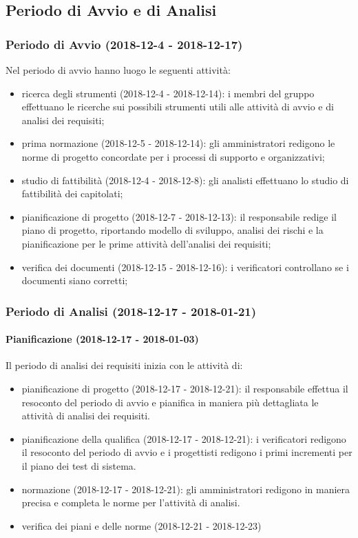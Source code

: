 \subsection{Periodo di Avvio e di Analisi }
	\subsubsection{Periodo di Avvio (2018-12-4 - 2018-12-17)}
		Nel periodo di avvio hanno luogo le seguenti attività:
		\begin{itemize}
			\item ricerca degli strumenti (2018-12-4 - 2018-12-14): i membri del gruppo effettuano le ricerche sui possibili strumenti utili alle attività di avvio e di analisi dei requisiti;
			\item prima normazione (2018-12-5 - 2018-12-14): gli amministratori redigono le norme di progetto concordate per i processi di supporto e organizzativi;
			\item studio di fattibilità (2018-12-4 - 2018-12-8): gli analisti effettuano lo studio di fattibilità dei capitolati;
			\item pianificazione di progetto (2018-12-7 - 2018-12-13): il responsabile redige il piano di progetto, riportando modello di sviluppo, analisi dei rischi e la pianificazione per le prime attività dell'analisi dei requisiti;
			\item verifica dei documenti (2018-12-15 - 2018-12-16): i verificatori controllano se i documenti siano corretti;
		\end{itemize}
		
	\subsubsection{Periodo di Analisi (2018-12-17 - 2018-01-21)}	
		\paragraph{Pianificazione (2018-12-17 - 2018-01-03)\\} Il periodo di analisi dei requisiti inizia con le attività di:
			\begin{itemize}
				\item pianificazione di progetto (2018-12-17 - 2018-12-21): il responsabile effettua il resoconto del periodo di avvio e pianifica in maniera più dettagliata le attività di analisi dei requisiti. 
				\item pianificazione della qualifica (2018-12-17 - 2018-12-21): i verificatori redigono il resoconto del periodo di avvio e i progettisti redigono i primi incrementi per il piano dei test di sistema. 
				\item normazione (2018-12-17 - 2018-12-21): gli amministratori redigono in maniera precisa e completa le norme per l'attività di analisi. 
				\item verifica dei piani e delle norme (2018-12-21 - 2018-12-23)
			\end{itemize}
		
